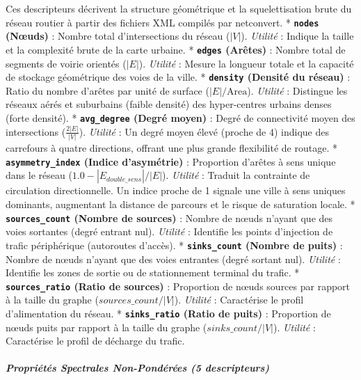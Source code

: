 \documentclass[10pt, a4paper]{article}
\begin{document}
Ces descripteurs décrivent la structure géométrique et la
squelettisation brute du réseau routier à partir des fichiers XML
compilés par netconvert. * \textbf{\texttt{nodes} (Nœuds)} : Nombre
total d'intersections du réseau (\(|V|\)). \emph{Utilité} : Indique la
taille et la complexité brute de la carte urbaine. *
\textbf{\texttt{edges} (Arêtes)} : Nombre total de segments de voirie
orientés (\(|E|\)). \emph{Utilité} : Mesure la longueur totale et la
capacité de stockage géométrique des voies de la ville. *
\textbf{\texttt{density} (Densité du réseau)} : Ratio du nombre d'arêtes
par unité de surface (\(|E|/\text{Area}\)). \emph{Utilité} : Distingue
les réseaux aérés et suburbains (faible densité) des hyper-centres
urbains denses (forte densité). * \textbf{\texttt{avg\_degree} (Degré
moyen)} : Degré de connectivité moyen des intersections
(\(\frac{2|E|}{|V|}\)). \emph{Utilité} : Un degré moyen élevé (proche de
4) indique des carrefours à quatre directions, offrant une plus grande
flexibilité de routage. * \textbf{\texttt{asymmetry\_index} (Indice
d'asymétrie)} : Proportion d'arêtes à sens unique dans le réseau
(\(1.0 - |E_{double\_sens}|/|E|\)). \emph{Utilité} : Traduit la
contrainte de circulation directionnelle. Un indice proche de 1 signale
une ville à sens uniques dominants, augmentant la distance de parcours
et le risque de saturation locale. * \textbf{\texttt{sources\_count}
(Nombre de sources)} : Nombre de nœuds n'ayant que des voies sortantes
(degré entrant nul). \emph{Utilité} : Identifie les points d'injection
de trafic périphérique (autoroutes d'accès). *
\textbf{\texttt{sinks\_count} (Nombre de puits)} : Nombre de nœuds
n'ayant que des voies entrantes (degré sortant nul). \emph{Utilité} :
Identifie les zones de sortie ou de stationnement terminal du trafic. *
\textbf{\texttt{sources\_ratio} (Ratio de sources)} : Proportion de
nœuds sources par rapport à la taille du graphe
(\(sources\_count/|V|\)). \emph{Utilité} : Caractérise le profil
d'alimentation du réseau. * \textbf{\texttt{sinks\_ratio} (Ratio de
puits)} : Proportion de nœuds puits par rapport à la taille du graphe
(\(sinks\_count/|V|\)). \emph{Utilité} : Caractérise le profil de
décharge du trafic.

\subparagraph{Propriétés Spectrales Non-Pondérées (5
descripteurs)}\label{propriuxe9tuxe9s-spectrales-non-ponduxe9ruxe9es-5-descripteurs}
\end{document}
